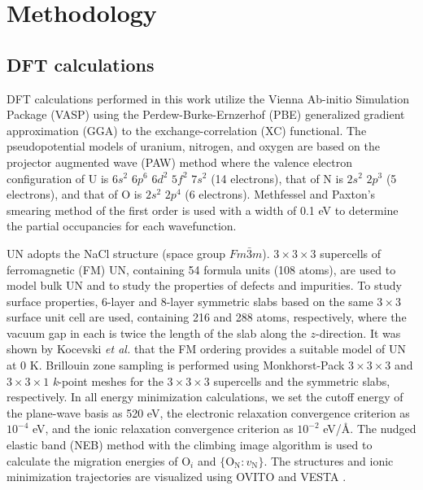 \documentclass[preprint,12pt,sort&compress]{elsarticle}
\newcommand{\?}{\stackrel{?}{=}}
\begin{document}
\section{Methodology}

\subsection{DFT calculations}

DFT calculations performed in this work utilize the Vienna Ab-initio Simulation Package (VASP) \cite{Kresse1993, Kresse1996a, Kresse1996b} using the Perdew-Burke-Ernzerhof (PBE) \cite{Perdew1996} generalized gradient approximation (GGA) to the exchange-correlation (XC) functional. The pseudopotential models of uranium, nitrogen, and oxygen are based on the projector augmented wave (PAW) method \cite{Kresse1999} where the valence electron configuration of U is $6s^2$ $6p^6$ $6d^2$ $5f^2$ $7s^2$ (14 electrons), that of N is $2s^2$ $2p^3$ (5 electrons), and that of O is $2s^2$ $2p^4$ (6 electrons). Methfessel and Paxton’s smearing method \cite{Methfessel1989} of the first order is used with a width of 0.1 eV to determine the partial occupancies for each wavefunction.

UN adopts the NaCl structure (space group $Fm\bar{3}m$). $3 \times 3 \times 3$ supercells of ferromagnetic (FM) UN, containing 54 formula units (108 atoms), are used to model bulk UN and to study the properties of defects and impurities. To study surface properties, 6-layer and 8-layer symmetric slabs based on the same $3 \times 3$ surface unit cell are used, containing 216 and 288 atoms, respectively, where the vacuum gap in each is twice the length of the slab along the $z$-direction. It was shown by Kocevski \textit{et al.}
\cite{Kocevski2022I} that the FM ordering provides a suitable model of UN at 0 K. Brillouin zone sampling is performed using Monkhorst-Pack \cite{Monkhorst1976} $3 \times 3 \times 3$ and $3 \times 3 \times 1$ \textit{k}-point meshes for the $3 \times 3 \times 3$ supercells and the symmetric slabs, respectively. In all energy minimization calculations, we set the cutoff energy of the plane-wave basis as 520 eV, the electronic relaxation convergence criterion as $10^{-4}$ eV, and the ionic relaxation convergence criterion as $10^{-2}$ eV/\AA. The nudged elastic band (NEB) method \cite{Henkelman2000a} with the climbing image algorithm \cite{Henkelman2000b} is used to calculate the migration energies of O$_i$ and $\{\text{O}_\text{N} \! : \! v_\text{N}\}$. The structures and ionic minimization trajectories are visualized using OVITO \cite{Stukowski2010} and VESTA \cite{Momma2008}.
\end{document}
